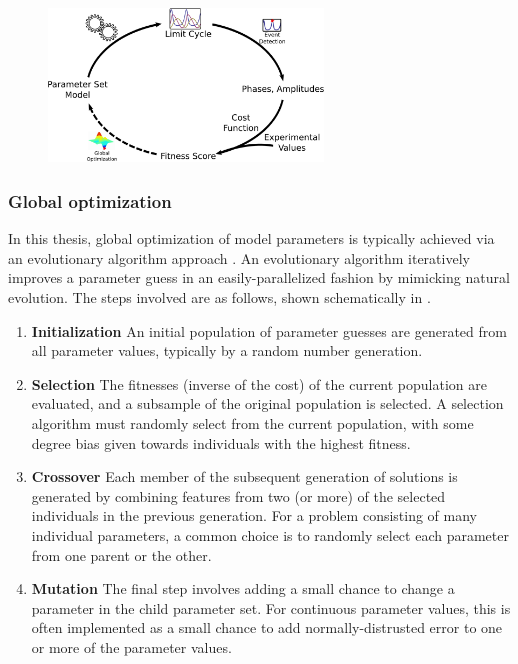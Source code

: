 \begin{figure}[tbp]
  \centering
  \includegraphics[width=0.65\textwidth]{chap1/figures/comp_loop.pdf}
  \label{fig:comploop}
\end{figure}

\subsubsection{Global optimization}\label{sec:gas}
In this thesis, global optimization of model parameters is typically achieved via an evolutionary algorithm approach \cite{Whitley2001}. 
An evolutionary algorithm iteratively improves a parameter guess in an easily-parallelized fashion by mimicking natural evolution.
The steps involved are as follows, shown schematically in .
\begin{enumerate}
  \item {\bfseries Initialization} An initial population of parameter guesses are generated from all parameter values, typically by a random number generation.
  \item {\bfseries Selection} The fitnesses (inverse of the cost) of the current population are evaluated, and a subsample of the original population is selected. A selection algorithm must randomly select from the current population, with some degree bias given towards individuals with the highest fitness.
  \item {\bfseries Crossover} Each member of the subsequent generation of solutions is generated by combining features from two (or more) of the selected individuals in the previous generation. For a problem consisting of many individual parameters, a common choice is to randomly select each parameter from one parent or the other.
  \item {\bfseries Mutation} The final step involves adding a small chance to change a parameter in the child parameter set. For continuous parameter values, this is often implemented as a small chance to add normally-distrusted error to one or more of the parameter values.
\end{enumerate}

